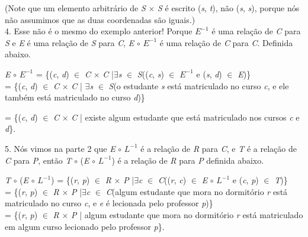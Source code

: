 (Note que um elemento arbitrário de \textit{S} $\times$ \textit{S} é escrito (\textit{s}, \textit{t}), não (\textit{s}, \textit{s}), porque nós não assumimos que as duas coordenadas são iguais.)
\\
4. Esse não é o mesmo do exemplo anterior! Porque $\textit{E}^{-1}$ é uma relação de \textit{C} para \textit{S} e \textit{E} é uma relação de \textit{S} para \textit{C}, \textit{E} $\circ$ $\textit{E}^{-1}$ é uma relação de \textit{C} para \textit{C}. Definida abaixo.
\begin{center}
\textit{E} $\circ$ $\textit{E}^{-1}$ = \{(\textit{c}, \textit{d}) $\in$ \textit{C} $\times$ \textit{C} |$\exists$\textit{s} $\in$ \textit{S}((\textit{c}, \textit{s}) $\in$ $\textit{E}^{-1}$ e (\textit{s}, \textit{d}) $\in$ \textit{E})\}
\\
= \{(\textit{c}, \textit{d}) $\in$ \textit{C} $\times$ \textit{C} | $\exists$\textit{s} $\in$ \textit{S}(o estudante \textit{s} está matriculado no curso \textit{c}, e ele também está matriculado no curso \textit{d})\}

= \{(\textit{c}, \textit{d}) $\in$ \textit{C} $\times$ \textit{C} | existe algum estudante que está matriculado nos cursos \textit{c} e \textit{d}\}.
\end{center}

5. Nós vimos na parte 2 que \textit{E} $\circ$ $\textit{L}^{-1}$ é a relação de \textit{R} para \textit{C}, e \textit{T} é a relação de \textit{C} para \textit{P}, então \textit{T} $\circ$ (\textit{E} $\circ$ $\textit{L}^{-1}$) é a relação de \textit{R} para \textit{P} definida abaixo.
\begin{center}
\textit{T} $\circ$ (\textit{E} $\circ$ $\textit{L}^{-1}$) = \{(\textit{r}, \textit{p}) $\in$ \textit{R} $\times$ \textit{P} |$\exists$\textit{c} $\in$ \textit{C}((\textit{r}, \textit{c}) $\in$ \textit{E} $\circ$ $\textit{L}^{-1}$ e (\textit{c}, \textit{p}) $\in$ \textit{T})\}
\\
= \{(\textit{r}, \textit{p}) $\in$ \textit{R} $\times$ \textit{P} |$\exists$\textit{c} $\in$ \textit{C}(algum estudante que mora no dormitório \textit{r} está matriculado no curso \textit{c}, e \textit{e} é lecionada pelo professor \textit{p})\}
\\
= \{(\textit{r}, \textit{p}) $\in$ \textit{R} $\times$ \textit{P} | algum estudante que mora no dormitório \textit{r} está matriculado em algum curso lecionado pelo professor \textit{p}\}.
\end{center}

